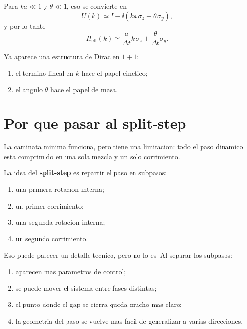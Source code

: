 Para \(ka\ll 1\) y \(\theta\ll 1\), eso se convierte en
\begin{equation}
U(k)\simeq I-\ii\left(ka\,\sigma_z+\theta\,\sigma_y\right),
\end{equation}
y por lo tanto
\begin{equation}
H_{\text{eff}}(k)\simeq \frac{a}{\Delta t}k\,\sigma_z+\frac{\theta}{\Delta t}\sigma_y.
\label{c04:eq:heff-min}
\end{equation}

Ya aparece una estructura de Dirac en \(1+1\):

\begin{enumerate}[leftmargin=*]
  \item el termino lineal en \(k\) hace el papel cinetico;
  \item el angulo \(\theta\) hace el papel de masa.
\end{enumerate}

\section{Por que pasar al split-step}

La caminata minima funciona, pero tiene una limitacion: todo el paso dinamico esta comprimido en una sola mezcla y un solo corrimiento.

La idea del \textbf{split-step} es repartir el paso en subpasos:

\begin{enumerate}[leftmargin=*]
  \item una primera rotacion interna;
  \item un primer corrimiento;
  \item una segunda rotacion interna;
  \item un segundo corrimiento.
\end{enumerate}

Eso puede parecer un detalle tecnico, pero no lo es. Al separar los subpasos:

\begin{enumerate}[leftmargin=*]
  \item aparecen mas parametros de control;
  \item se puede mover el sistema entre fases distintas;
  \item el punto donde el gap se cierra queda mucho mas claro;
  \item la geometria del paso se vuelve mas facil de generalizar a varias direcciones.
\end{enumerate}

